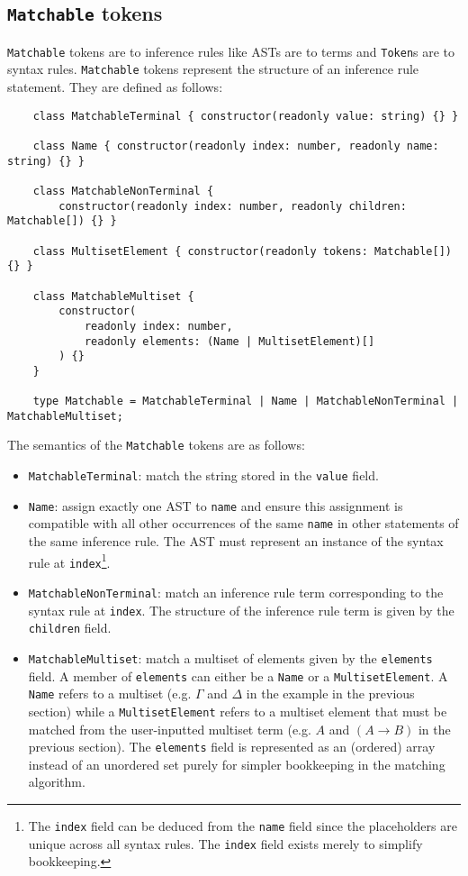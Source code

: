 \subsection{\texorpdfstring{\lstinline{Matchable}}{Matchable} tokens}
\lstinline{Matchable} tokens are to inference rules like ASTs are to terms and \lstinline{Token}s are to syntax rules. \lstinline{Matchable} tokens represent the structure of an inference rule statement. They are defined as follows:
\begin{lstlisting}
    class MatchableTerminal { constructor(readonly value: string) {} }

    class Name { constructor(readonly index: number, readonly name: string) {} }

    class MatchableNonTerminal {
        constructor(readonly index: number, readonly children: Matchable[]) {} }

    class MultisetElement { constructor(readonly tokens: Matchable[]) {} }

    class MatchableMultiset {
        constructor(
            readonly index: number,
            readonly elements: (Name | MultisetElement)[]
        ) {}
    }

    type Matchable = MatchableTerminal | Name | MatchableNonTerminal | MatchableMultiset;
\end{lstlisting}
The semantics of the \lstinline{Matchable} tokens are as follows:
\begin{itemize}
    \item \lstinline{MatchableTerminal}: match the string stored in the \lstinline{value} field.
    \item \lstinline{Name}: assign exactly one AST to \lstinline{name} and ensure this assignment is compatible with all other occurrences of the same \lstinline{name} in other statements of the same inference rule. The AST must represent an instance of the syntax rule at \lstinline{index}\footnote{The \lstinline{index} field can be deduced from the \lstinline{name} field since the placeholders are unique across all syntax rules. The \lstinline{index} field exists merely to simplify bookkeeping.}.
    \item \lstinline{MatchableNonTerminal}: match an inference rule term corresponding to the syntax rule at \lstinline{index}. The structure of the inference rule term is given by the \lstinline{children} field.
    \item \lstinline{MatchableMultiset}: match a multiset of elements given by the \lstinline{elements} field. A member of \lstinline{elements} can either be a \lstinline{Name} or a \lstinline{MultisetElement}. A \lstinline{Name} refers to a multiset (e.g. $\Gamma$ and $\Delta$ in the example in the previous section) while a \lstinline{MultisetElement} refers to a multiset element that must be matched from the user-inputted multiset term (e.g. $A$ and $(A \to B)$ in the previous section). The \lstinline{elements} field is represented as an (ordered) array instead of an unordered set purely for simpler bookkeeping in the matching algorithm.
\end{itemize}
